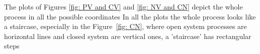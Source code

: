 \documentclass[journal,article,submit,pdftex,moreauthors]{Definitions/mdpi}
\newcommand{\ncl}{n_\mathrm{Cl^-}}
\newcommand{\gel}{^\mathrm{gel}}
\newcommand{\cl}{\mathrm{Cl^-}}
\newcommand{\cs}{c_{\mathrm{s}}}
\newcommand{\Vgel}{V_\mathrm{gel}}
\newcommand{\Pgel}{\Pi}
\begin{document}
The plots of Figures \ref{fig: PV and CV} and \ref{fig: NV and CN} depict the whole process in all the possible coordinates
In all the plots the whole process looks like a staircase, especially in the Figure~\ref{fig: CN}, where open system processes are horizontal lines and closed system are vertical ones, a 'staircase' has rectangular steps








\end{document}
